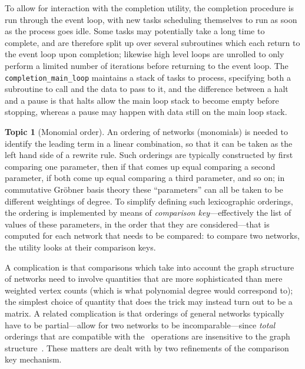 \documentclass{article}
\theoremstyle{definition}
\newtheorem{topic}{Topic}
\newcommand{\PROP}{\smaller{PROP}}
\begin{document}
To allow for interaction with the completion utility, the completion 
procedure is run through the event loop, with new tasks scheduling 
themselves to run as soon as the process goes idle. Some tasks may 
potentially take a long time to complete, and are therefore split up 
over several subroutines which each return to the event loop upon 
completion; likewise high level loops are unrolled to only perform a 
limited number of iterations before returning to the event loop. The 
\verb|completion_main_loop| maintains a stack of tasks to process, 
specifying both a subroutine to call and the data to pass to it, and 
the difference between a halt and a pause is that halts allow the 
main loop stack to become empty before stopping, whereas a pause may 
happen with data still on the main loop stack.


\begin{topic}[Monomial order]
  An ordering of networks (monomials) is needed to identify the 
  leading term in a linear combination, so that it can be taken as the 
  left hand side of a rewrite rule. Such orderings are typically 
  constructed by first comparing one parameter, then if that comes up 
  equal comparing a second parameter, if both come up equal comparing 
  a third parameter, and so on; in commutative Gr\"obner basis theory 
  these ``parameters'' can all be taken to be different weightings of 
  degree. To simplify defining such lexicographic orderings, the 
  ordering is implemented by means of \emph{comparison 
  key}---effectively the list of values of these parameters, in the 
  order that they are considered---that is computed for each network 
  that needs to be compared: to compare two networks, the utility 
  looks at their comparison keys.
  
  A complication is that comparisons which take into account the 
  graph structure of networks need to involve quantities that 
  are more sophisticated than mere weighted vertex counts (which is 
  what polynomial degree would correspond to); the simplest choice of 
  quantity that does the trick may instead turn out to be a matrix. 
  A related 
  complication is that orderings of general networks typically have 
  to be partial---allow for two networks to be incomparable---since 
  \emph{total} orderings that are compatible with the \PROP\ 
  operations are insensitive to the graph 
  structure~\cite[p.~31--32]{NR1}. These matters are dealt with by 
  two refinements of the comparison key mechanism.
  

\end{topic}
\end{document}
